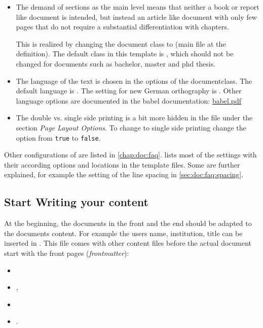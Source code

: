 \begin{itemize}
\item The demand of sections as the main level means that neither a book or report like document is intended, but instead an article like document with only few pages that do not require a substantial differentiation with chapters.

This is realized by changing the document class to  (main file at the  definition). The default class in this template is , which should not be changed for documents such as bachelor, master and phd thesis.
%
\item The language of the text is chosen in the options of the documentclass. The default language is . The setting for new German orthography is . Other language options are documented in the babel documentation: \href{http://mirrors.ctan.org/macros/latex/required/babel/babel.pdf}{babel.pdf}
%
\item The double vs. single side printing is a bit more hidden in the file  under the section \emph{Page Layout Options}. To change to single side printing change the option  from \texttt{true} to \texttt{false}.
\end{itemize}

Other configurations of \latex are listed in \cref{chap:doc:faq}.  lists most of the settings with their according options and locations in the template files. Some are further explained, 
for example the setting of the line spacing in \cref{sec:doc:faq:spacing}.

\subsection{Start Writing your content}

At the beginning, the documents in the front and the end should be adapted to the documents content. For example the users name, institution, title can be inserted in . This file comes with other content files before the actual document start with the front pages (\emph{frontmatter}):
%
\begin{itemize}
\item {}
\item {},
\item {}
\item {}.
\end{itemize}
%

